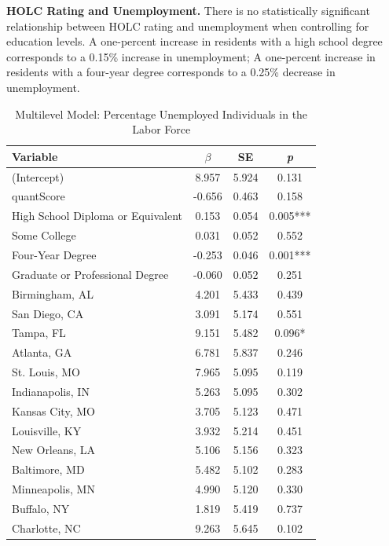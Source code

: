 \documentclass[paper=letter, fontsize=12pt]{scrartcl} %
\begin{document}
	\begin{table}
		\textbf{HOLC Rating and Unemployment.} There is no statistically significant relationship between HOLC rating and unemployment when controlling for education levels. A one-percent increase in residents with a high school degree corresponds to a 0.15\% increase in unemployment; A one-percent increase in residents with a four-year degree corresponds to a 0.25\% decrease in unemployment.
		\caption{Multilevel Model: Percentage Unemployed Individuals in the Labor Force}
		\begin{center}
			\begin{tabular}{|| l | c c c ||}
				\hline
				Variable & $\beta$ & SE & \textit{p}\\
				\hline \hline
				(Intercept) & 8.957 & 5.924 & 0.131\\
				\hline 
				quantScore & -0.656 & 0.463 & 0.158\\
				\hline 
				High School Diploma or Equivalent & 0.153 & 0.054 & 0.005***\\
				\hline 
				Some College & 0.031 & 0.052 & 0.552\\
				\hline 
				Four-Year Degree & -0.253 & 0.046 & 0.001***\\
				\hline 
				Graduate or Professional Degree & -0.060 & 0.052 & 0.251\\
				\hline 
				Birmingham, AL & 4.201 & 5.433 & 0.439\\
				\hline 
				San Diego, CA & 3.091 & 5.174 & 0.551\\
				\hline 
				Tampa, FL & 9.151 & 5.482 & 0.096*\\
				\hline 
				Atlanta, GA & 6.781 & 5.837 & 0.246\\
				\hline 
				St. Louis, MO & 7.965 & 5.095 & 0.119\\
				\hline 
				Indianapolis, IN & 5.263 & 5.095 & 0.302\\
				\hline 
				Kansas City, MO & 3.705 & 5.123 & 0.471\\
				\hline 
				Louisville, KY & 3.932 & 5.214 & 0.451\\
				\hline 
				New Orleans, LA & 5.106 & 5.156 & 0.323\\
				\hline 
				Baltimore, MD & 5.482 & 5.102 & 0.283\\
				\hline 
				Minneapolis, MN & 4.990 & 5.120 & 0.330\\
				\hline 
				Buffalo, NY & 1.819 & 5.419 & 0.737\\
				\hline 
				Charlotte, NC & 9.263 & 5.645 & 0.102\\

\end{tabular}
\end{center}
\end{table}
\end{document}
